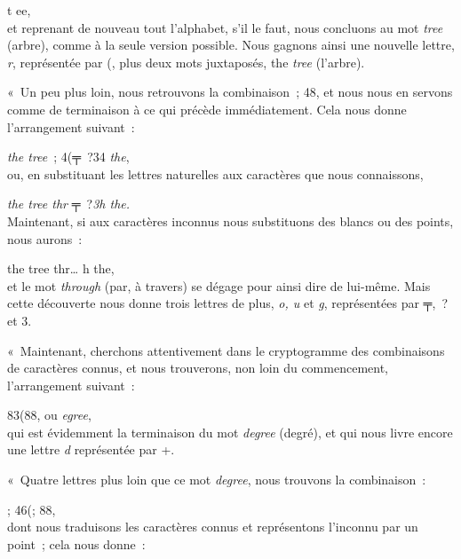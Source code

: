 \documentclass[french,twoside]{book} %
\begin{document}
t ee,\\

\noindent et reprenant de nouveau tout l’alphabet, s’il le faut, nous concluons au mot \emph{tree} (arbre), comme à la seule version possible. Nous gagnons ainsi une nouvelle lettre, \emph{r}, représentée par (, plus deux mots juxtaposés, the \emph{tree} (l’arbre).\par
« Un peu plus loin, nous retrouvons la combinaison ; 48, et nous nous en servons comme de terminaison à ce qui précède immédiatement. Cela nous donne l’arrangement suivant :\par

\emph{the tree} ; 4(╤ ?34 \emph{the},\\

\noindent ou, en substituant les lettres naturelles aux caractères que nous connaissons,\par

\emph{the tree thr} ╤ ?\emph{3h the.}\\

\noindent Maintenant, si aux caractères inconnus nous substituons des blancs ou des points, nous aurons :\par

the tree thr… h the,\\

\noindent et le mot \emph{through} (par, à travers) se dégage pour ainsi dire de lui-même. Mais cette découverte nous donne trois lettres de plus, \emph{o, u} et \emph{g}, représentées par ╤, ? et 3.\par
« Maintenant, cherchons attentivement dans le cryptogramme des combinaisons de caractères connus, et nous trouverons, non loin du commencement, l’arrangement suivant :\par

83(88, ou \emph{egree},\\

\noindent qui est évidemment la terminaison du mot\emph{ degree} (degré), et qui nous livre encore une lettre \emph{d} représentée par +.\par
« Quatre lettres plus loin que ce mot \emph{degree}, nous trouvons la combinaison :\par

; 46(; 88,\\

\noindent dont nous traduisons les caractères connus et représentons l’inconnu par un point ; cela nous donne :\par
\end{document}
